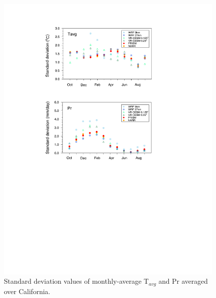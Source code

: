 \documentclass[draft,ms]{agutex}   %
\begin{document}
\begin{figure}
\begin{center}
\includegraphics[width=6in]{trd_t2avg_pr_std.pdf}
\end{center}
\caption{Standard deviation values of monthly-average T$_{avg}$ and Pr averaged over California.} \label{fig:Figure 7}
\end{figure}
\end{document}
